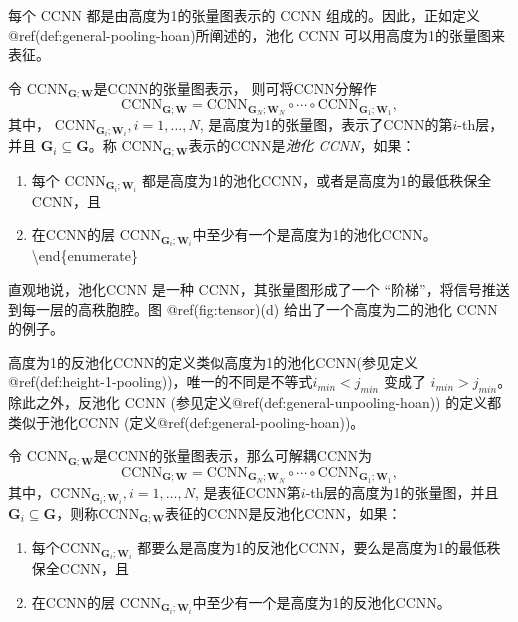 \documentclass[
  12pt,
]{krantz}
\providecommand{\tightlist}{%
  \setlength{\itemsep}{0pt}\setlength{\parskip}{0pt}}
\begin{document}
每个 CCNN 都是由高度为1的张量图表示的 CCNN 组成的。因此，正如定义
@ref(def:general-pooling-hoan)所阐述的，池化 CCNN
可以用高度为1的张量图来表征。

\label{general-pooling-hoan}
令 \(\mbox{CCNN}_{\mathbf{G};\mathbf{W}}\)是CCNN的张量图表示，
则可将CCNN分解作 \begin{equation*}
\mbox{CCNN}_{\mathbf{G};\mathbf{W}}=
\mbox{CCNN}_{\mathbf{G}_N;\mathbf{W}_N} \circ \cdots \circ \mbox{CCNN}_{\mathbf{G}_1;\mathbf{W}_1},
\end{equation*} 其中，
\(\mbox{CCNN}_{\mathbf{G}_i;\mathbf{W}_i},i=1,\ldots,N\),
是高度为1的张量图，表示了CCNN的第\(i\)-th层，并且
\(\mathbf{G}_i \subseteq \mathbf{G}\)。称
\(\mbox{CCNN}_{\mathbf{G};\mathbf{W}}\)表示的CCNN是\emph{池化
CCNN}，如果：

\begin{enumerate}
\def\labelenumi{\arabic{enumi}.}
\tightlist
\item
  每个 \(\mbox{CCNN}_{\mathbf{G}_i;\mathbf{W}_i}\)
  都是高度为1的池化CCNN，或者是高度为1的最低秩保全CCNN，且
\item
  在CCNN的层
  \(\mbox{CCNN}_{\mathbf{G}_i;\mathbf{W}_i}\)中至少有一个是高度为1的池化CCNN。
  \textbackslash end\{enumerate\}
\end{enumerate}

直观地说，池化CCNN 是一种 CCNN，其张量图形成了一个
``阶梯''，将信号推送到每一层的高秩胞腔。图 @ref(fig:tensor)(d)
给出了一个高度为二的池化 CCNN 的例子。

高度为1的反池化CCNN的定义类似高度为1的池化CCNN(参见定义@ref(def:height-1-pooling))，唯一的不同是不等式\(i_{min}<j_{min}\)
变成了 \(i_{min}>j_{min}\)。除此之外，反池化 CCNN
(参见定义@ref(def:general-unpooling-hoan)) 的定义都类似于池化CCNN
(定义@ref(def:general-pooling-hoan))。

\label{general-unpooling-hoan}
令
\(\mbox{CCNN}_{\mathbf{G};\mathbf{W}}\)是CCNN的张量图表示，那么可解耦CCNN为
\begin{equation*}
\mbox{CCNN}_{\mathbf{G};\mathbf{W}}=
\mbox{CCNN}_{\mathbf{G}_N;\mathbf{W}_N} \circ \cdots \circ \mbox{CCNN}_{\mathbf{G}_1;\mathbf{W}_1},
\end{equation*}
其中，\(\mbox{CCNN}_{\mathbf{G}_i;\mathbf{W}_i},i=1,\ldots,N\),
是表征CCNN第\(i\)-th层的高度为1的张量图，并且
\(\mathbf{G}_i \subseteq \mathbf{G}\)，则称\(\mbox{CCNN}_{\mathbf{G};\mathbf{W}}\)表征的CCNN是反池化CCNN，如果：

\begin{enumerate}
\def\labelenumi{\arabic{enumi}.}
\tightlist
\item
  每个\(\mbox{CCNN}_{\mathbf{G}_i;\mathbf{W}_i}\)
  都要么是高度为1的反池化CCNN，要么是高度为1的最低秩保全CCNN，且
\item
  在CCNN的层
  \(\mbox{CCNN}_{\mathbf{G}_i;\mathbf{W}_i}\)中至少有一个是高度为1的反池化CCNN。
\end{enumerate}
\end{document}
